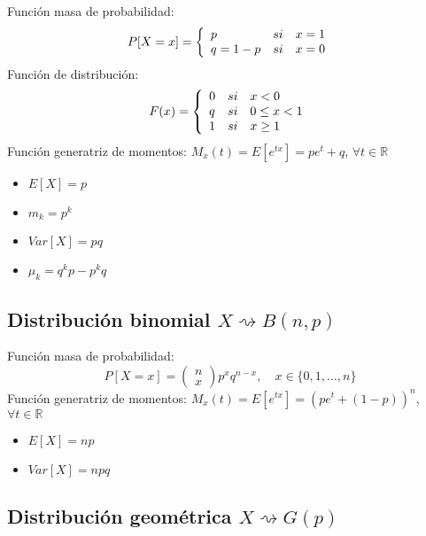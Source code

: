 \documentclass[11pt,twoside,titlepage,a4paper]{article}
\theoremstyle{definition}
\theoremstyle{plain_rojo}
\theoremstyle{remark}
\begin{document}
Función masa de probabilidad:
\begin{equation*}
P[X=x]=\left\{
	\begin{array}{l c l}
	p & si & x=1 \\
	q=1-p & si & x=0
	\end{array}
\right.
\end{equation*}
Función de distribución:
\begin{equation*}
F(x)=\left\{
	\begin{array}{l c l}
	0 & si & x<0 \\
	q & si & 0\leq x<1 \\
	1 & si & x\geq 1
	\end{array}
\right.
\end{equation*}
Función generatriz de momentos: $M_x(t)=E[e^{tx}]=pe^t+q$, $\forall t\in\mathbb{R}$
\begin{multicols}{2}
	\begin{itemize}[label={}]
		\item $E[X]=p$
		\item $m_k=p^k$
		\item $Var[X]=pq$
		\item $\mu_k=q^kp-p^kq$
	\end{itemize}
\end{multicols}

\subsection{Distribución binomial $X\rightsquigarrow B(n,p)$}

Función masa de probabilidad:
\begin{equation*}
P[X=x]=\left(
	\!\begin{array}{c}
	n \\
	x
	\end{array}
\!\right)p^xq^{n-x},\quad x\in\{0,1,\ldots,n\}
\end{equation*}
Función generatriz de momentos: $M_x(t)=E[e^{tx}]=(pe^t+(1-p))^n$, $\forall t\in\mathbb{R}$
\begin{multicols}{2}
	\begin{itemize}[label={}]
		\item $E[X]=np$
		\item $Var[X]=npq$
	\end{itemize}
\end{multicols}

\subsection{Distribución geométrica $X\rightsquigarrow G(p)$}
\end{document}

